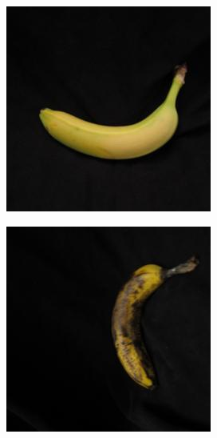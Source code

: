 \documentclass{article} %
\begin{document}
\begin{figure}[h]
\begin{subfigure}{.123\textwidth}
\captionsetup{labelformat=empty}
\caption{}
\end{subfigure}%
  \begin{subfigure}{.123\textwidth}
  \centering
\includegraphics[width=\textwidth]{../results/q_samples/mis_ripe/PRE_2_RIPE_5.jpg}
\captionsetup{labelformat=empty}
\caption{}
\end{subfigure}%
  \begin{subfigure}{.123\textwidth}
  \centering
\includegraphics[width=\textwidth]{../results/q_samples/mis_ripe/ROTTEN_2_RIPE_2.jpg}

\end{subfigure}
\end{figure}
\end{document}
